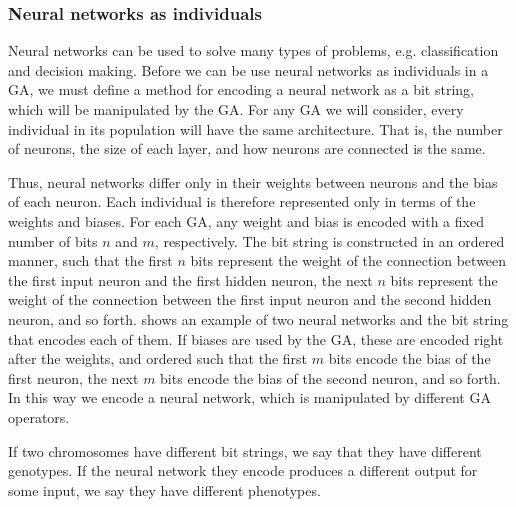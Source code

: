\subsubsection{Neural networks as individuals}

Neural networks can be used to solve many types of problems, e.g. classification and decision making.
Before we can be use neural networks as individuals in a GA, we must define a method for encoding a neural network as a bit string, which will be manipulated by the GA. For any GA we will consider, every individual in its population will have the same architecture. That is, the number of neurons, the size of each layer, and how neurons are connected is the same.


Thus, neural networks differ only in their weights between neurons and the bias of each neuron. Each individual is therefore represented only in terms of the weights and biases. For each GA, any weight and bias is encoded with a fixed number of bits $n$ and $m$, respectively. The bit string is constructed in an ordered manner, such that the first $n$ bits represent the weight of the connection between the first input neuron and the first hidden neuron, the next $n$ bits represent the weight of the connection between the first input neuron and the second hidden neuron, and so forth.  shows an example of two neural networks and the bit string that encodes each of them. If biases are used by the GA, these are encoded right after the weights, and ordered such that the first $m$ bits encode the bias of the first neuron, the next $m$ bits encode the bias of the second neuron, and so forth. In this way we encode a neural network, which is manipulated by different GA operators.

If two chromosomes have different bit strings, we say that they have different genotypes. If the neural network they encode produces a different output for some input, we say they have different phenotypes.



%
